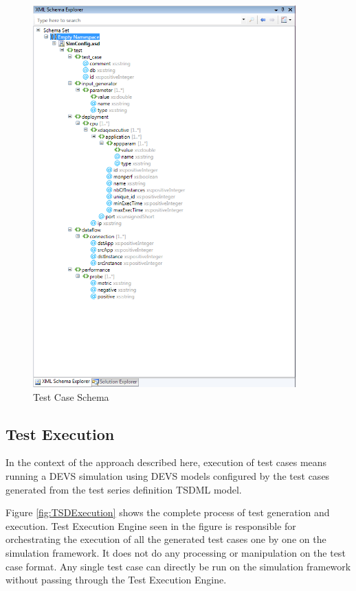 \begin{figure}
	\centering
		\includegraphics[width=0.90\textwidth]{figures/TSDConfigSchema.png}
	\caption{Test Case Schema}
	\label{fig:TSDConfigSchema}
\end{figure}

\subsection{Test Execution}
In the context of the approach described here, execution of test cases means running a DEVS simulation using DEVS models configured by the test cases generated from the test series definition TSDML model.

Figure \ref{fig:TSDExecution} shows the complete process of test generation and execution. Test Execution Engine seen in the figure is responsible for orchestrating the execution of all the generated test cases one by one on the simulation framework. It does not do any processing or manipulation on the test case format. Any single test case can directly be run on the simulation framework without passing through the Test Execution Engine.

